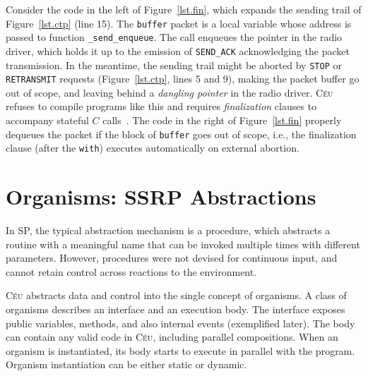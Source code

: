 \documentclass{sigplanconf}
\newcommand{\CEU}{\textsc{C\'{e}u}\xspace}
\newcommand{\code}[1] {{\small{\texttt{#1}}}}
\newcommand{\1}{\;}
\newcommand{\2}{\;\;}
\newcommand{\3}{\;\;\;}
\newcommand{\5}{\;\;\;\;\;}
\begin{document}
Consider the code in the left of Figure~\ref{lst.fin}, which expands the 
sending trail of Figure~\ref{lst.ctp} (line 15).
%
The \code{buffer} packet is a local variable whose address is passed to 
function \code{\_send\_enqueue}.
The call enqueues the pointer in the radio driver, which holds it up to the 
emission of \code{SEND\_ACK} acknowledging the packet transmission.
%
In the meantime, the sending trail might be aborted by \code{STOP} or 
\code{RETRANSMIT} requests (Figure~\ref{lst.ctp}, lines 5 and 9), making the 
packet buffer go out of scope, and leaving behind a \emph{dangling pointer} in 
the radio driver.
%
\CEU refuses to compile programs like this and requires \emph{finalization} 
clauses to accompany stateful $C$ calls~\cite{ceu.sensys13}.
The code in the right of Figure~\ref{lst.fin} properly dequeues the packet if
the block of \code{buffer} goes out of scope, i.e., the finalization clause 
(after the \code{with}) executes automatically on external abortion.

\section{Organisms: SSRP Abstractions}
\label{sec.orgs}


%
In SP, the typical abstraction mechanism is a procedure, which abstracts a 
routine with a meaningful name that can be invoked multiple times with 
different parameters.
%
However, procedures were not devised for continuous input, and cannot retain 
control across reactions to the environment.
%

\CEU abstracts data and control into the single concept of organisms.
%
A class of organisms describes an interface and an execution body.
The interface exposes public variables, methods, and also internal events 
(exemplified later).
The body can contain any valid code in \CEU, including parallel compositions.
When an organism is instantiated, its body starts to execute in parallel with 
the program.
Organism instantiation can be either static or dynamic.
\end{document}
